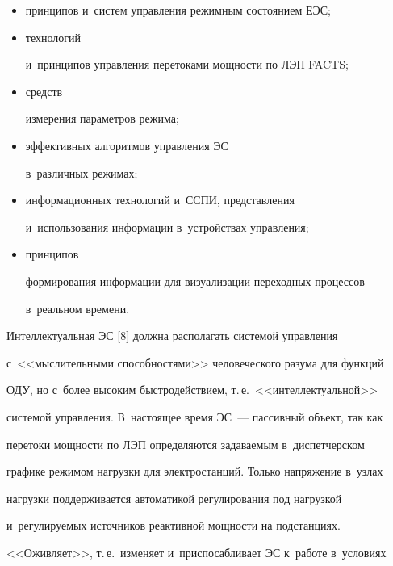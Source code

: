 \begin{itemize}


\item принципов и~систем управления режимным состоянием ЕЭС;\\[-12pt]


\item технологий 


и~принципов управления перетоками мощности по ЛЭП FACTS;


\item средств 


измерения параметров режима; %


\item эффективных алгоритмов управления ЭС 


в~различных режимах; %


\item информационных технологий и~ССПИ, представления 


и~использования информации в~устройствах управ\-ле\-ния; %


\item принципов 


формирования информации для визуализации переходных процессов 


в~реальном времени.


\end{itemize}


  


  Интеллектуальная ЭС [8] должна располагать системой управления 


с~<<мыс\-ли\-тель\-ны\-ми способностями>> человеческого разума для функций 


ОДУ, но с~более высоким быстродействием, т.\,е.\ <<интеллектуальной>> 


системой управления. В~настоящее время ЭС~--- пассивный объект, так как 


перетоки мощности по ЛЭП определяются задаваемым в~диспетчерском 


графике режимом нагрузки для электростанций. Только напряжение в~узлах 


нагрузки поддерживается автоматикой регулирования под нагрузкой 


и~регулируемых источников реактивной мощ\-ности на подстанциях. 


<<Оживляет>>, т.\,е.\ изменяет и~приспосабливает ЭС к~работе в~условиях 


